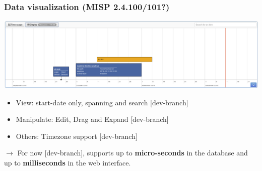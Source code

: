 \begin{frame}
        \frametitle{Data visualization (MISP 2.4.100/101?)}
    \includegraphics[width=1.0\linewidth]{pics/timeline.png}
    \begin{itemize}
        \item View: start-date only, spanning and search [dev-branch]
        \item Manipulate: Edit, Drag and Expand [dev-branch]
        \item Others: Timezone support [dev-branch]
    \end{itemize}

    \vspace{0.3cm}
    $\rightarrow$ For now [dev-branch], supports up to \textbf{micro-seconds} in the database and up to \textbf{milliseconds} in the web interface.
\end{frame}
